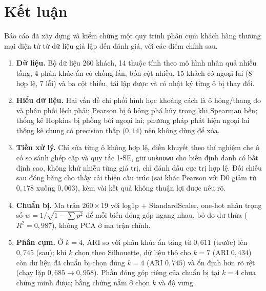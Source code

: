 \section{Kết luận}
\label{sec:concl}

Báo cáo đã xây dựng và kiểm chứng một quy trình phân cụm khách hàng thương mại điện tử từ dữ liệu giả lập đến đánh giá, với các điểm chính sau.
\begin{enumerate}
\item \textbf{Dữ liệu.} Bộ dữ liệu 260 khách, 14 thuộc tính theo mô hình nhân quả nhiều tầng, 4 phân khúc ẩn có chồng lấn, bốn cột nhiễu, 15 khách có ngoại lai (8 hợp lệ, 7 lỗi) và ba cột thiếu, tái lập được và có nhật ký từng ô bị thay đổi.
\item \textbf{Hiểu dữ liệu.} Hai vấn đề chi phối hình học khoảng cách là ô hỏng/thang đo và phân phối lệch phải; Pearson bị ô hỏng phá hủy trong khi Spearman bền; thống kê Hopkins bị phồng bởi ngoại lai; phương pháp phát hiện ngoại lai thống kê chung có precision thấp ($0{,}14$) nên không dùng để xóa.
\item \textbf{Tiền xử lý.} Chỉ sửa từng ô không hợp lệ, điền khuyết theo thí nghiệm che ô có so sánh ghép cặp và quy tắc 1-SE, giữ \texttt{unknown} cho biến định danh có bất định cao, không khử nhiễu từng giá trị, chỉ đánh dấu cực trị hợp lệ. Đối chiếu sau đóng băng cho thấy cải thiện cấu trúc (sai khác Pearson với D0 giảm từ $0{,}178$ xuống $0{,}063$), kèm vài kết quả không thuận lợi được nêu rõ.
\item \textbf{Chuẩn bị.} Ma trận $260\times19$ với log1p + StandardScaler, one-hot nhân trọng số $w=1/\sqrt{1-\sum p^2}$ để mỗi biến đóng góp ngang nhau, bỏ  do dư thừa ($R^2=0{,}987$), không PCA ở ma trận chính.
\item \textbf{Phân cụm.} Ở $k=4$, ARI so với phân khúc ẩn tăng từ $0{,}611$ (trước) lên $0{,}745$ (sau); khi $k$ chọn theo Silhouette, dữ liệu thô cho $k=7$ (ARI $0{,}434$) còn dữ liệu đã chuẩn bị chọn đúng $k=4$ (ARI $0{,}745$) và ổn định hơn rõ rệt (chạy lặp $0{,}685\to0{,}958$).
Phần đóng góp riêng của chuẩn bị tại $k=4$ chưa chứng minh được; bằng chứng nằm ở chọn $k$ và độ vững.
\end{enumerate}
